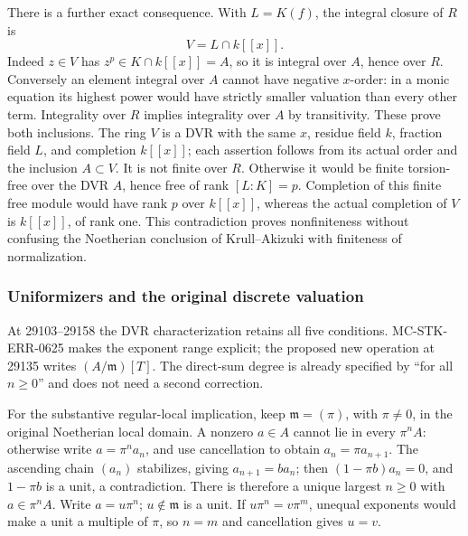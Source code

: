 There is a further exact consequence. With \(L=K(f)\), the integral closure of \(R\) is \[
 V=L\cap k[[x]].
\] Indeed \(z\in V\) has \(z^p\in K\cap k[[x]]=A\), so it is integral over \(A\), hence over \(R\). Conversely an element integral over \(A\) cannot have negative \(x\)-order: in a monic equation its highest power would have strictly smaller valuation than every other term. Integrality over \(R\) implies integrality over \(A\) by transitivity. These prove both inclusions. The ring \(V\) is a DVR with the same \(x\), residue field \(k\), fraction field \(L\), and completion \(k[[x]]\); each assertion follows from its actual order and the inclusion \(A\subset V\). It is not finite over \(R\). Otherwise it would be finite torsion-free over the DVR \(A\), hence free of rank \([L:K]=p\). Completion of this finite free module would have rank \(p\) over \(k[[x]]\), whereas the actual completion of \(V\) is \(k[[x]]\), of rank one. This contradiction proves nonfiniteness without confusing the Noetherian conclusion of Krull--Akizuki with finiteness of normalization.

\subsubsection{Uniformizers and the original discrete valuation}\label{algebra-proof-028-uniformizers-and-the-original-discrete-valuation}

At 29103--29158 the DVR characterization retains all five conditions. MC-\AlgebraIdentifierBreak{}STK-\AlgebraIdentifierBreak{}ERR-\AlgebraIdentifierBreak{}0625 makes the exponent range explicit; the proposed new operation at 29135 writes \((A/\mathfrak m)[T]\). The direct-sum degree is already specified by ``for all \(n\ge0\)'' and does not need a second correction.

For the substantive regular-local implication, keep \(\mathfrak m=(\pi)\), with \(\pi\ne0\), in the original Noetherian local domain. A nonzero \(a\in A\) cannot lie in every \(\pi^nA\): otherwise write \(a=\pi^n a_n\), and use cancellation to obtain \(a_n=\pi a_{n+1}\). The ascending chain \((a_n)\) stabilizes, giving \(a_{n+1}=b a_n\); then \((1-\pi b)a_n=0\), and \(1-\pi b\) is a unit, a contradiction. There is therefore a unique largest \(n\ge0\) with \(a\in\pi^nA\). Write \(a=u\pi^n\); \(u\notin\mathfrak m\) is a unit. If \(u\pi^n=v\pi^m\), unequal exponents would make a unit a multiple of \(\pi\), so \(n=m\) and cancellation gives \(u=v\).

